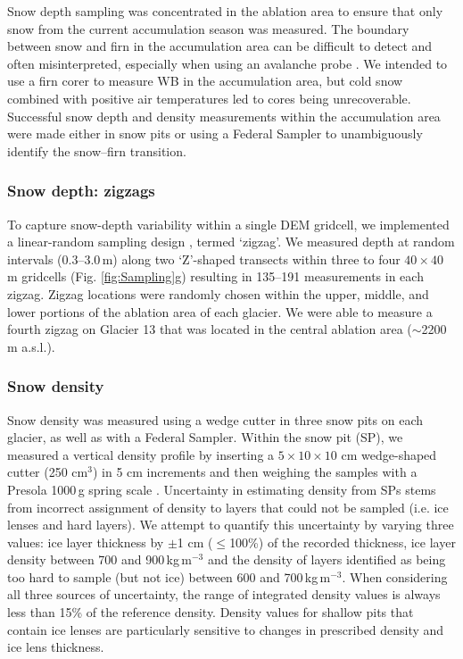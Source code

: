 \documentclass[twocolumn, letterpaper]{igs}
\begin{document}
Snow depth sampling was concentrated in the ablation area to ensure that only snow from the current accumulation season was measured. The boundary between snow and firn in the accumulation area can be difficult to detect and often misinterpreted, especially when using an avalanche probe \citep{Grunewald2010,Sold2013}. We intended to use a firn corer to measure WB in the accumulation area, but cold snow combined with positive air temperatures led to cores being unrecoverable. Successful snow depth and density measurements within the accumulation area were made either in snow pits or using a Federal Sampler to unambiguously identify the snow--firn transition. 

\subsubsection{Snow depth: zigzags}

To capture snow-depth variability within a single DEM gridcell, we implemented a linear-random sampling design \citep{Shea2010}, termed `zigzag'. We measured depth at random intervals (0.3--3.0\,m) along two `Z'-shaped transects within three to four $40\times40$ m gridcells (Fig. \ref{fig:Sampling}g) resulting in 135--191 measurements in each zigzag. Zigzag locations were randomly chosen within the upper, middle, and lower portions of the ablation area of each glacier. We were able to measure a fourth zigzag on Glacier 13 that was located in the central ablation area ($\sim$2200 m a.s.l.).

\subsubsection{Snow density}

Snow density was measured using a wedge cutter in three snow pits on each glacier, as well as with a Federal Sampler. Within the snow pit (SP), we measured a vertical density profile by inserting a $5\times10\times 10$ cm wedge-shaped cutter (250 cm$^3$) in 5 cm increments and then weighing the samples with a Presola 1000\,g spring scale \citep[e.g.][]{Gray1981,Fierz2009}. Uncertainty in estimating density from SPs stems from incorrect assignment of density to layers that could not be sampled (i.e. ice lenses and hard layers). We attempt to quantify this uncertainty by varying three values: ice layer thickness by $\pm$1 cm ($\leq$100\%) of the recorded thickness, ice layer density between 700 and 900\,kg\,m$^{-3}$ and the density of layers identified as being too hard to sample (but not ice) between 600 and 700\,kg\,m$^{-3}$. When considering all three sources of uncertainty, the range of integrated density values is always less than 15\% of the reference density. Density values for shallow pits that contain ice lenses are particularly sensitive to changes in prescribed density and ice lens thickness. 
\end{document}
